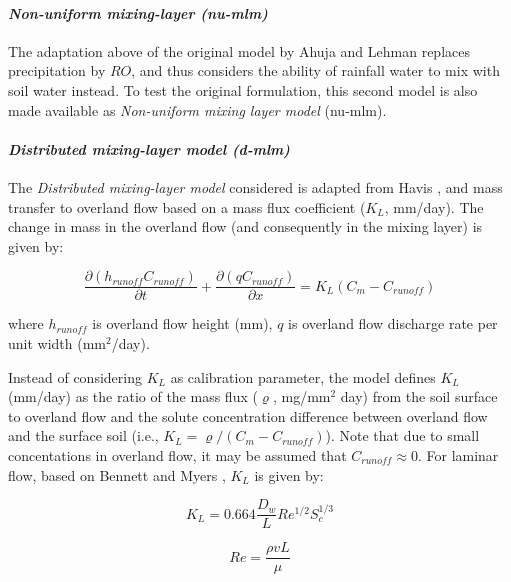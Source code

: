 \documentclass[]{article}
\let\oldparagraph\paragraph
\renewcommand{\paragraph}[1]{\oldparagraph{#1}\mbox{}}
\begin{document}
\hypertarget{section-1}{%
\paragraph{\texorpdfstring{\textit{Non-uniform mixing-layer (nu-mlm)}}{}}\label{section-1}}

The adaptation above of the original model by Ahuja and Lehman replaces
precipitation by \(RO\), and thus considers the ability of rainfall
water to mix with soil water instead. To test the original formulation,
this second model is also made available as
\textit{Non-uniform mixing layer model} (nu-mlm).

\hypertarget{section-2}{%
\paragraph{\texorpdfstring{\textit{Distributed mixing-layer model (d-mlm)}}{}}\label{section-2}}

The \textit{Distributed mixing-layer model} considered is adapted from
Havis \citeyearpar{Havis1992}, and mass transfer to overland flow based
on a mass flux coefficient (\(K_L\), mm/day). The change in mass in the
overland flow (and consequently in the mixing layer) is given by:

\begin{equation}
\frac{\partial (h_{runoff} C_{runoff}) }{\partial t} + \frac{\partial(qC_{runoff}) }{\partial x} = K_L (C_m - C_{runoff})
\label{eq:d-mlm-of}
\end{equation}

where \(h_{runoff}\) is overland flow height (mm), \(q\) is overland
flow discharge rate per unit width (mm\(^2\)/day).

Instead of considering \(K_L\) as calibration parameter, the model
defines \(K_L\) (mm/day) as the ratio of the mass flux (\(\varrho\),
mg/mm\(^2\) day) from the soil surface to overland flow and the solute
concentration difference between overland flow and the surface soil
(i.e., \(K_L = \varrho /(C_m - C_{runoff})\)). Note that due to small
concentations in overland flow, it may be assumed that
\(C_{runoff} \approx 0\). For laminar flow, based on Bennett and Myers
\citeyearpar{Bennet1982}, \(K_L\) is given by:

\begin{equation}
K_L = 0.664 \frac{D_w}{L}Re^{1/2}S_c^{1/3}
\label{eq:K_L}
\end{equation}

\begin{equation}
Re = \frac{\rho v L}{\mu}
\label{eq:Re}
\end{equation}
\end{document}

